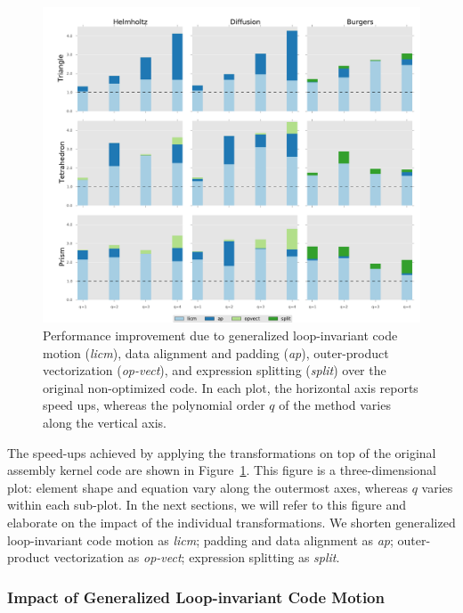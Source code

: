 \begin{figure}[t]
\centerline{\includegraphics[scale=0.45]{lowlevelopt/perf-results/individual/graph}}
\caption{Performance improvement due to generalized loop-invariant code motion (\emph{licm}), data alignment and padding (\emph{ap}), outer-product vectorization (\emph{op-vect}), and expression splitting (\emph{split}) over the original non-optimized code. In each plot, the horizontal axis reports speed ups, whereas the polynomial order $q$ of the method varies along the vertical axis.}
\label{fig:coffee-individual-res}
\end{figure}

The speed-ups achieved by applying the transformations on top of the original assembly kernel code are shown in Figure~\ref{fig:coffee-individual-res}. This figure is a three-dimensional plot: element shape and equation vary along the outermost axes, whereas $q$ varies within each sub-plot. In the next sections, we will refer to this figure and elaborate on the impact of the individual transformations. We shorten generalized loop-invariant code motion as \emph{licm}; padding and data alignment as \emph{ap}; outer-product vectorization as \emph{op-vect}; expression splitting as \emph{split}.

\subsubsection{Impact of Generalized Loop-invariant Code Motion}
\label{sec:perf-eval-licm}

